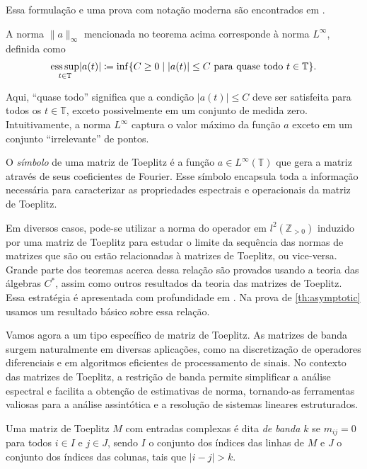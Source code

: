 Essa formulação e uma prova com notação moderna são encontrados em \cite[p. 1]{bottcher}.

A norma $\| a \|_{\infty}$ mencionada no teorema acima corresponde à norma $L^\infty$, definida como
\[ \operatorname*{ess\,sup}_{t \in \mathbb{T}}\lvert a(t)\rvert \coloneqq \inf \{ C \geq 0 \mid |a(t)| \leq C \text{ para quase todo } t \in \mathbb{T} \}\text{.}
\]

Aqui, ``quase todo'' significa que a condição $|a(t)| \leq C$ deve ser satisfeita para todos os $t \in \mathbb{T}$, exceto possivelmente em um conjunto de medida zero. Intuitivamente, a norma $L^\infty$ captura o valor máximo da função $a$ exceto em um conjunto ``irrelevante'' de pontos.

O \textit{símbolo} de uma matriz de Toeplitz é a função $a \in L^\infty(\mathbb{T})$ que gera a matriz através de seus coeficientes de Fourier. Esse símbolo encapsula toda a informação necessária para caracterizar as propriedades espectrais e operacionais da matriz de Toeplitz.

Em diversos casos, pode-se utilizar a norma do operador em $l^2(\mathbb{Z}_{> 0})$ induzido por uma matriz de Toeplitz para estudar o limite da sequência das normas de matrizes que são ou estão relacionadas à matrizes de Toeplitz, ou vice-versa. Grande parte dos teoremas acerca dessa relação são provados usando a teoria das álgebras $C^\ast$, assim como outros resultados da teoria das matrizes de Toeplitz. Essa estratégia é apresentada com profundidade em \cite{bottcher}. Na prova de \ref{th:asymptotic} usamos um resultado básico sobre essa relação.

Vamos agora a um tipo específico de matriz de Toeplitz. As matrizes de banda surgem naturalmente em diversas aplicações, como na discretização de operadores diferenciais e em algoritmos eficientes de processamento de sinais. No contexto das matrizes de Toeplitz, a restrição de banda permite simplificar a análise espectral e facilita a obtenção de estimativas de norma, tornando-as ferramentas valiosas para a análise assintótica e a resolução de sistemas lineares estruturados.

\begin{definition*}
  Uma matriz de Toeplitz $ M $ com entradas complexas é dita \textit{de banda $ k $} se $ m_{ij} = 0 $ para todos $ i \in I$ e $j \in J $, sendo $I$ o conjunto dos índices das linhas de $M$ e $J$ o conjunto dos índices das colunas, tais que $ |i - j| > k $.
\end{definition*}

